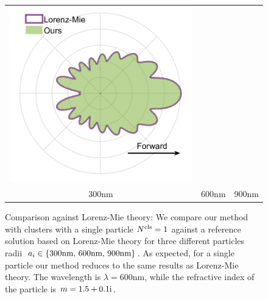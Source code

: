 \begin{figure}
\begin{tabular}{ccc}
        \includegraphics[width=\resLen]{images/pfunc/mie_900nm.png}  
        \\
        300nm & 600nm & 900nm
    \end{tabular}
    \caption{\label{fig:mie}
    Comparison against Lorenz-Mie theory: We compare our method with clusters with a single particle ${N^\text{cls}}=1$ against a reference solution based on Lorenz-Mie theory for three different particles radii~$a_i \in \{ \text{300nm, 600nm, 900nm} \}$. As expected, for a single particle our method reduces to the same results as Lorenz-Mie theory. The wavelength is $\lambda=600$nm, while the refractive index of the particle is $m=1.5+0.1\text{i}$.  
}
\end{figure}
